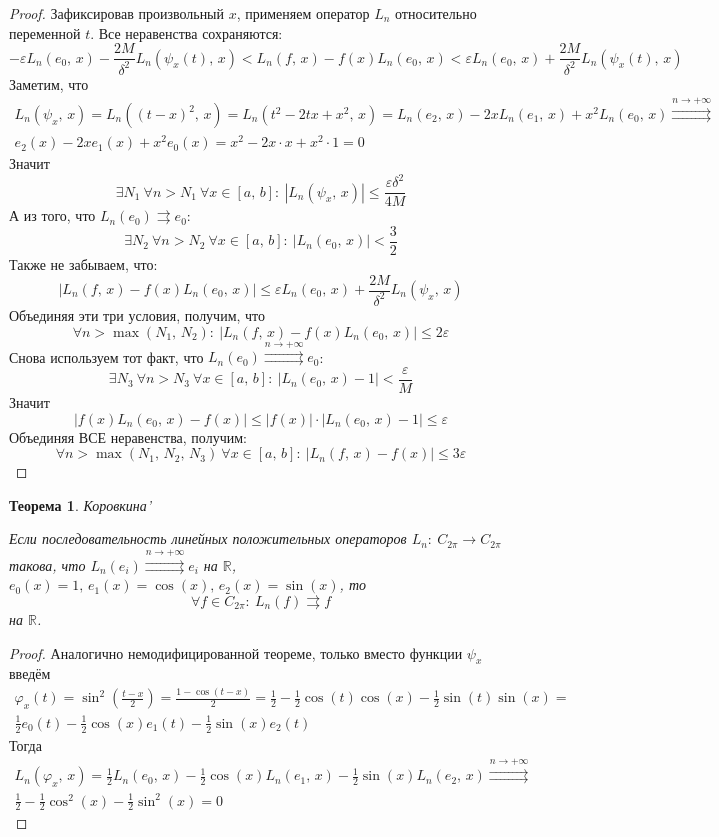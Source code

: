 \documentclass[a4paper,12pt]{article}
\renewcommand{\phi}{\ensuremath{\varphi}}
\renewcommand{\leq}{\ensuremath{\leqslant}}
\theoremstyle{plain}
\newtheorem{theorem}{Теорема}[section]
\theoremstyle{definition}
\theoremstyle{remark}
\begin{document}
\begin{proof}
	Зафиксировав произвольный $x$, применяем оператор $L_n$ относительно переменной $t$. Все неравенства сохраняются:
	\[-\varepsilon L_n(e_0,\, x) - \frac{2M}{\delta^2}L_n(\psi_x(t),\,x) < L_n(f,\,x) - f(x)L_n(e_0,\,x) < \varepsilon L_n(e_0,\, x) + \frac{2M}{\delta^2}L_n(\psi_x(t),\,x)\]
	Заметим, что
	\begin{align*}
		L_n(\psi_x,\,x) = L_n((t - x)^2,\,x) = L_n(t^2 - 2tx + x^2,\,x) = L_n(e_2,\,x) - 2xL_n(e_1,\,x) + x^2L_n(e_0,\,x) \stackrel{n \to +\infty}{\rightrightarrows} \\
		e_2(x) - 2xe_1(x) + x^2e_0(x) = x^2 - 2x\cdot x + x^2\cdot 1 = 0
	\end{align*}
	Значит
	\[\exists N_1 \: \forall n > N_1 \: \forall x \in [a,\,b]:\: |L_n(\psi_x,\,x)| \leq \frac{\varepsilon\delta^2}{4M}\]
	А из того, что $L_n(e_0) \rightrightarrows e_0$:
	\[\exists N_2 \: \forall n > N_2 \: \forall x \in [a,\,b] :\: |L_n(e_0,\,x)| < \frac{3}{2}\]
	Также не забываем, что:
	\[|L_n(f,\,x) - f(x)L_n(e_0,\,x)| \leq \varepsilon L_n(e_0,\,x) + \frac{2M}{\delta^2}L_n(\psi_x,\,x)\]
	Объединяя эти три условия, получим, что
	\[\forall n > \max(N_1,\,N_2):\: |L_n(f,\,x) - f(x)L_n(e_0,\,x)| \leq 2\varepsilon\]
	Снова используем тот факт, что $L_n(e_0) \stackrel{n \to +\infty}{\rightrightarrows} e_0$:
	\[\exists N_3 \: \forall n > N_3 \: \forall x \in [a,\,b]:\: |L_n(e_0,\,x) - 1| < \frac{\varepsilon}{M}\]
	Значит
	\[|f(x)L_n(e_0,\,x) - f(x)| \leq |f(x)|\cdot|L_n(e_0,\,x) - 1| \leq \varepsilon\]
	Объединяя ВСЕ неравенства, получим:
	\[\forall n > \max(N_1,\,N_2,\,N_3) \: \forall x \in [a,\,b]:\: |L_n(f,\,x) - f(x)|\leq 3\varepsilon\]
\end{proof}

\begin{theorem}
	Коровкина'

	Если последовательность линейных положительных операторов $L_n:\: C_{2\pi} \to C_{2\pi}$ такова, что $L_n(e_i) \stackrel{n \to +\infty}{\rightrightarrows} e_i$ на $\mathbb{R}$, $e_0(x) = 1,\, e_1(x) = \cos(x),\, e_2(x) = \sin(x)$, то
	\[\forall f \in C_{2\pi}:\: L_n(f) \rightrightarrows f\]
	на $\mathbb{R}$.
\end{theorem}

\begin{proof}
	Аналогично немодифицированной теореме, только вместо функции $\psi_x$ введём
	\begin{align*}
		\phi_x(t) = \sin^2\left(\frac{t - x}{2}\right) = \frac{1 - \cos(t - x)}{2} = \frac{1}{2} - \frac{1}{2}\cos(t)\cos(x) - \frac{1}{2}\sin(t)\sin(x) = \\
		\frac{1}{2}e_0(t) - \frac{1}{2}\cos(x)e_1(t) - \frac{1}{2}\sin(x)e_2(t)
	\end{align*}
	Тогда
	\begin{align*}
		L_n(\phi_x,\, x) = \frac{1}{2}L_n(e_0,\,x) - \frac{1}{2}\cos(x)L_n(e_1,\,x) - \frac{1}{2}\sin(x)L_n(e_2,\,x) \stackrel{n \to +\infty}{\rightrightarrows} \\
		\frac{1}{2} - \frac{1}{2}\cos^2(x) - \frac{1}{2}\sin^2(x) = 0
	\end{align*}
\end{proof}
\end{document}
